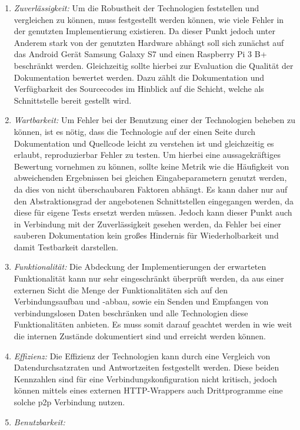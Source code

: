 \documentclass[12pt,a4paper]{article}
\begin{document}
    	\begin{enumerate}
    	\item {\it Zuverlässigkeit:} 
    	Um die Robustheit der Technologien feststellen und vergleichen zu können, muss festgestellt werden können, wie viele Fehler in der genutzten Implementierung existieren. Da dieser Punkt jedoch unter Anderem stark von der genutzten Hardware abhängt soll sich zunächst auf das Android Gerät Samsung Galaxy S7 und einen Raspberry Pi 3 B+ beschränkt werden. Gleichzeitig sollte hierbei zur Evaluation die Qualität der Dokumentation bewertet werden. Dazu zählt die Dokumentation und Verfügbarkeit des Sourcecodes im Hinblick auf die Schicht, welche als Schnittstelle bereit gestellt wird.
    	\item {\it Wartbarkeit:} Um Fehler bei der Benutzung einer der Technologien beheben zu können, ist es nötig, dass die Technologie auf der einen Seite durch Dokumentation und Quellcode leicht zu verstehen ist und gleichzeitig es erlaubt, reproduzierbar Fehler zu testen. Um hierbei eine aussagekräftiges Bewertung vornehmen zu können, sollte keine Metrik wie die Häufigkeit von abweichenden Ergebnissen bei gleichen Eingabeparametern genutzt werden, da dies von nicht überschaubaren Faktoren abhängt. Es kann daher nur auf den Abstraktionsgrad der angebotenen Schnittstellen eingegangen werden, da diese für eigene Tests ersetzt werden müssen. Jedoch kann dieser Punkt auch in Verbindung mit der Zuverlässigkeit gesehen werden, da Fehler bei einer sauberen Dokumentation kein großes Hindernis für Wiederholbarkeit und damit Testbarkeit darstellen.
    	\item {\it Funktionalität:}
    	Die Abdeckung der Implementierungen der erwarteten Funktionalität kann nur sehr eingeschränkt überprüft werden, da aus einer externen Sicht die Menge der Funktionalitäten sich auf den Verbindungsaufbau und -abbau, sowie ein Senden und Empfangen von verbindungslosen Daten beschränken und alle Technologien diese Funktionalitäten anbieten. Es muss somit darauf geachtet werden in wie weit die internen Zustände dokumentiert sind und erreicht werden können.
    	\item {\it Effizienz:}
    	Die Effizienz der Technologien kann durch eine Vergleich von Datendurchsatzraten und Antwortzeiten festgestellt werden. Diese beiden Kennzahlen sind für eine Verbindungskonfiguration nicht kritisch, jedoch können mittels eines externen HTTP-Wrappers auch Drittprogramme eine solche p2p Verbindung nutzen.
    	\item {\it Benutzbarkeit:}

\end{enumerate}
\end{document}
